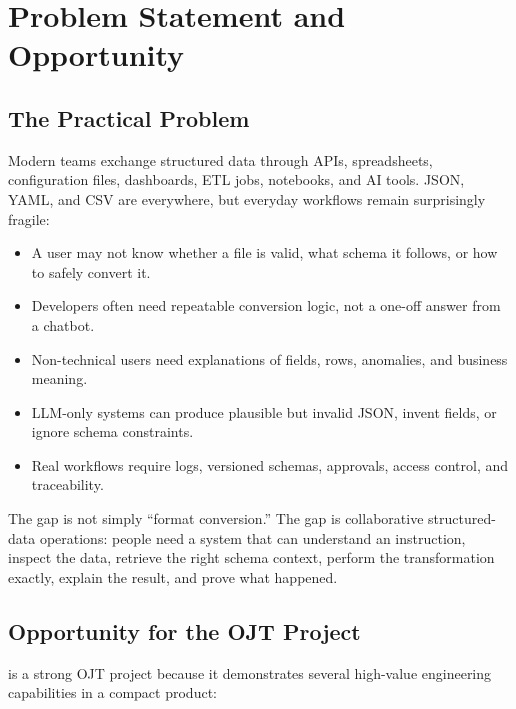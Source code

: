 \section{Problem Statement and Opportunity}

\subsection{The Practical Problem}

Modern teams exchange structured data through APIs, spreadsheets, configuration files, dashboards, ETL jobs, notebooks, and AI tools. JSON, YAML, and CSV are everywhere, but everyday workflows remain surprisingly fragile:

\begin{itemize}
  \item A user may not know whether a file is valid, what schema it follows, or how to safely convert it.
  \item Developers often need repeatable conversion logic, not a one-off answer from a chatbot.
  \item Non-technical users need explanations of fields, rows, anomalies, and business meaning.
  \item LLM-only systems can produce plausible but invalid JSON, invent fields, or ignore schema constraints.
  \item Real workflows require logs, versioned schemas, approvals, access control, and traceability.
\end{itemize}

The gap is not simply ``format conversion.'' The gap is collaborative structured-data operations: people need a system that can understand an instruction, inspect the data, retrieve the right schema context, perform the transformation exactly, explain the result, and prove what happened.

\subsection{Opportunity for the OJT Project}

\projectname{} is a strong OJT project because it demonstrates several high-value engineering capabilities in a compact product:

